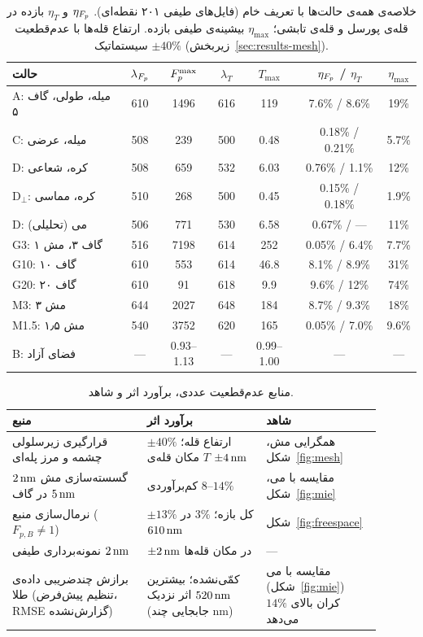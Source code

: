 \begin{table}[htbp]
  \centering
  \caption{خلاصه‌ی همه‌ی حالت‌ها با تعریف خام (فایل‌های طیفی ۲۰۱
  نقطه‌ای). $\eta_{F_p}$ و $\eta_T$ بازده در قله‌ی پورسل و قله‌ی تابشی؛
  $\eta_{\max}$ بیشینه‌ی طیفی بازده. ارتفاع قله‌ها با عدم‌قطعیت
  سیستماتیک $\pm 40\%$ (زیربخش~\ref{sec:results-mesh}).}
  \label{tab:summary}
  \begin{tabular}{lcccccc}
    \toprule
    حالت & $\lambda_{F_p}$ & $F_p^{\max}$ & $\lambda_{T}$ & $T_{\max}$ & $\eta_{F_p}$ / $\eta_T$ & $\eta_{\max}$ \\
    \midrule
    A: میله، طولی، گاف ۵ & 610 & 1496 & 616 & 119 & 7.6\% / 8.6\% & 19\% \\
    C: میله، عرضی & 508 & 239 & 500 & 0.48 & 0.18\% / 0.21\% & 5.7\% \\
    D: کره، شعاعی & 508 & 659 & 532 & 6.03 & 0.76\% / 1.1\% & 12\% \\
    D$_\perp$: کره، مماسی & 510 & 268 & 500 & 0.45 & 0.15\% / 0.18\% & 1.9\% \\
    D: می (تحلیلی) & 506 & 771 & 530 & 6.58 & 0.67\% / — & 11\% \\
    G3: گاف ۳، مش ۱ & 516 & 7198 & 614 & 252 & 0.05\% / 6.4\% & 7.7\% \\
    G10: گاف ۱۰ & 610 & 553 & 614 & 46.8 & 8.1\% / 8.9\% & 31\% \\
    G20: گاف ۲۰ & 610 & 91 & 618 & 9.9 & 9.6\% / 12\% & 74\% \\
    M3: مش ۳ & 644 & 2027 & 648 & 184 & 8.7\% / 9.3\% & 18\% \\
    M1.5: مش ۱٫۵ & 540 & 3752 & 620 & 165 & 0.05\% / 7.0\% & 9.6\% \\
    B: فضای آزاد & — & 0.93–1.13 & — & 0.99–1.00 & — & — \\
    \bottomrule
  \end{tabular}
\end{table}

\begin{table}[htbp]
  \centering
  \caption{منابع عدم‌قطعیت عددی، برآورد اثر و شاهد.}
  \label{tab:uncertainty}
  \begin{tabular}{p{0.34\linewidth}p{0.30\linewidth}p{0.26\linewidth}}
    \toprule
    منبع & برآورد اثر & شاهد \\
    \midrule
    قرارگیری زیرسلولی چشمه و مرز پله‌ای & $\pm 40\%$ ارتفاع قله؛ مکان قله‌ی $T$ $\pm4\,\text{nm}$ & همگرایی مش، شکل~\ref{fig:mesh} \\
    گسسته‌سازی مش $2\,\text{nm}$ در گاف $5\,\text{nm}$ & کم‌برآوردی $8$–$14\%$ & مقایسه با می، شکل~\ref{fig:mie} \\
    نرمال‌سازی منبع ($F_{p,B}\neq1$) & $\pm13\%$ کل بازه؛ $3\%$ در $610\,\text{nm}$ & شکل~\ref{fig:freespace} \\
    نمونه‌برداری طیفی $2\,\text{nm}$ & $\pm2\,\text{nm}$ در مکان قله‌ها & — \\
    برازش چندضریبی داده‌ی طلا (تنظیم پیش‌فرض، RMSE گزارش‌نشده) & کمّی‌نشده؛ بیشترین اثر نزدیک $520\,\text{nm}$ (جابجایی چند nm) & مقایسه با می (شکل~\ref{fig:mie}) کران بالای $14\%$ می‌دهد \\
    \bottomrule
  \end{tabular}
\end{table}

